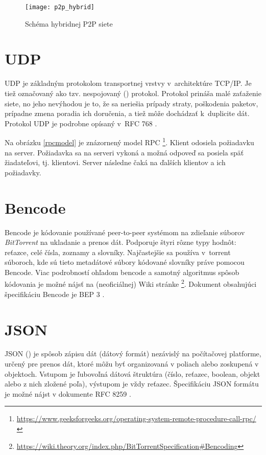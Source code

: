 \begin{figure}[H]
	\texttt{[image: p2p\_hybrid]}
	\caption{Schéma hybridnej P2P siete}
	\label{hybripp2p}
\end{figure}

\section*{UDP}

UDP je základným protokolom transportnej vrstvy v~architektúre TCP/IP. Je tiež označovaný ako tzv. nespojovaný () protokol. Protokol prináša malé zaťaženie siete, no jeho nevýhodou je to, že sa neriešia prípady straty, poškodenia paketov, prípadne zmena poradia ich doručenia, a tiež môže dochádzať k~duplicite dát. Protokol UDP je podrobne opísaný v~RFC 768 \cite{rfc768}.


Na obrázku \ref{rpcmodel} je znázornený model RPC \footnote{\url{https://www.geeksforgeeks.org/operating-system-remote-procedure-call-rpc/}}. Klient odosiela požiadavku na server. Požiadavka sa na serveri vykoná a možná odpoveď sa posiela späť žiadateľovi, tj. klientovi. Server následne čaká na ďalších klientov a ich požiadavky.

\section*{Bencode}

Bencode je kódovanie používané peer-to-peer systémom na zdieľanie súborov \textit{BitTorrent} na ukladanie a prenos dát. Podporuje štyri rôzne typy hodnôt: reťazce, celé čísla, zoznamy a slovníky. Najčastejšie sa používa v~torrent súboroch, kde sú tieto metadátové súbory kódované slovníky práve pomocou Bencode. Viac podrobností ohľadom bencode a samotný algoritmus spôsob kódovania je možné nájsť na (neoficiálnej) Wiki stránke \footnote{\url{https://wiki.theory.org/index.php/BitTorrentSpecification\#Bencoding}}. Dokument obsahujúci špecifikáciu Bencode je BEP 3 \cite{bep3}.

\section*{JSON}

JSON () je spôsob zápisu dát (dátový formát) nezávislý na počítačovej platforme, určený pre prenos dát, ktoré môžu byť organizovaná v poliach alebo zoskupená v objektoch. Vstupom je ľubovoľná dátová štruktúra (číslo, reťazec, boolean, objekt alebo z nich zložené poľa), výstupom je vždy reťazec. Špecifikáciu JSON formátu je možné nájst v dokumente RFC 8259 \cite{rfc8259}.

